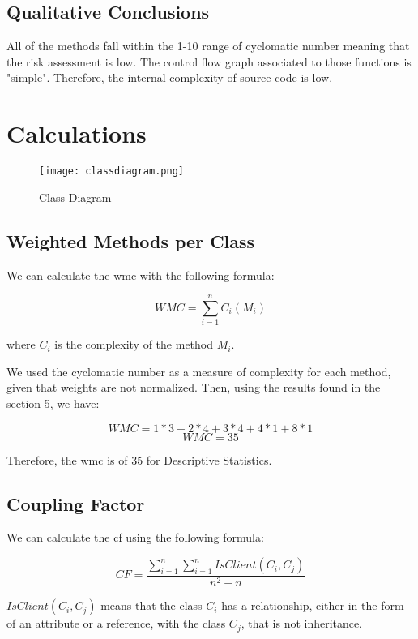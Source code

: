 \documentclass[11pt]{article}
\begin{document}
\newpage

\subsection{Qualitative Conclusions}

All of the methods fall within the 1-10 range of cyclomatic number meaning that the risk assessment is low. The control flow graph associated to those functions is "simple". Therefore, the internal complexity of source code is low.

\newpage

\section{Calculations}

\begin{figure}[h!]
	\centering
		\texttt{[image: classdiagram.png]}
	\caption{Class Diagram}
	\label{fig:classdiagram}
\end{figure}

\subsection{Weighted Methods per Class}

We can calculate the \gls{wmc} with the following formula:

$$ WMC = \sum\limits_{i=1}^{n} C_{i}(M_{i}) $$ 

where $ C_{i} $ is the complexity of the method $ M_{i} $.\newline

We used the cyclomatic number as a measure of complexity for each method, given that weights are not normalized. Then, using the results found in the section 5, we have:

$$ WMC = 1 * 3 + 2 * 4 + 3 * 4 + 4 * 1 + 8 * 1 $$ 
$$ WMC = 35 $$

Therefore, the \gls{wmc} is of 35 for Descriptive Statistics.

\subsection{Coupling Factor}

We can calculate the \gls{cf} using the following formula:

$$ CF = \frac{\sum\limits_{i=1}^{n} \sum\limits_{i=1}^{n} IsClient(C_{i},C_{j})}{n^2-n} $$

$ IsClient(C_{i},C_{j}) $ means that the class $ C_{i} $ has a relationship, either in the form of an attribute or a reference, with the class $ C_{j} $, that is not inheritance.\newline
\end{document}
